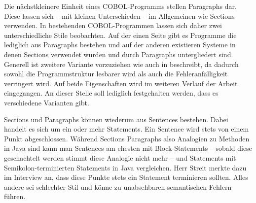 Die nächstkleinere Einheit eines COBOL-Programms stellen Paragraphs dar. Diese lassen sich -- mit kleinen Unterschieden -- im Allgemeinen wie Sections verwenden. In bestehenden COBOL-Programmen lassen sich daher zwei unterschiedliche Stile beobachten. Auf der einen Seite gibt es Programme die lediglich aus Paragraphs bestehen und auf der anderen existieren Systeme in denen Sections verwendet wurden und durch Paragraphs untergliedert sind. Generell ist zweitere Variante vorzuziehen wie auch \citeauthor{richards_enhancing_1984} in  beschreibt, da dadurch sowohl die Programmstruktur lesbarer wird als auch die Fehleranfälligkeit verringert wird. Auf beide Eigenschaften wird im weiteren Verlauf der Arbeit eingegangen. An dieser Stelle soll lediglich festgehalten werden, dass es verschiedene Varianten gibt.

Sections und Paragraphs können wiederum aus Sentences bestehen. Dabei handelt es sich um ein oder mehr Statements. Ein Sentence wird stets von einem Punkt abgeschlossen. Während Sections Paragraphs also Analogien zu Methoden in Java sind kann man Sentences am ehesten mit Block-Statements -- sobald diese geschachtelt werden stimmt diese Analogie nicht mehr -- und Statements mit Semikolon-terminierten Statements in Java vergleichen. Herr Streit merkte dazu im Interview an, dass diese Punkte stets ein Statement terminieren sollten. Alles andere sei schlechter Stil und könne zu unabsehbaren semantischen Fehlern führen. 

